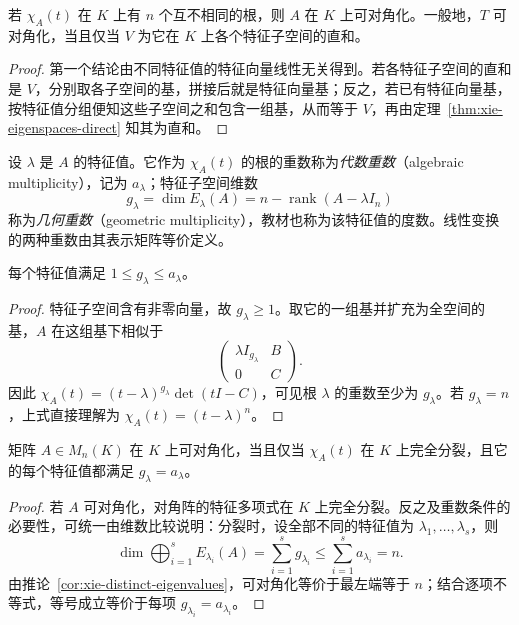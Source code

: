 \begin{corollary}
\label{cor:xie-distinct-eigenvalues}
若 $\chi_A(t)$ 在 $K$ 上有 $n$ 个互不相同的根，则 $A$ 在 $K$ 上可对角化。一般地，$T$ 可对角化，当且仅当 $V$ 为它在 $K$ 上各个特征子空间的直和。
\end{corollary}
\begin{proof}
第一个结论由不同特征值的特征向量线性无关得到。若各特征子空间的直和是 $V$，分别取各子空间的基，拼接后就是特征向量基；反之，若已有特征向量基，按特征值分组便知这些子空间之和包含一组基，从而等于 $V$，再由定理~\ref{thm:xie-eigenspaces-direct} 知其为直和。
\end{proof}

\begin{definition}
\label{def:xie-multiplicities}
设 $\lambda$ 是 $A$ 的特征值。它作为 $\chi_A(t)$ 的根的重数称为\emph{代数重数}（algebraic multiplicity），记为 $a_\lambda$；特征子空间维数
\[
 g_\lambda=\dim E_\lambda(A)=n-\operatorname{rank}(A-\lambda I_n)
\]
称为\emph{几何重数}（geometric multiplicity），教材也称为该特征值的度数。线性变换的两种重数由其表示矩阵等价定义。
\end{definition}

\begin{lemma}
\label{lem:xie-geometric-algebraic}
每个特征值满足 $1\leq g_\lambda\leq a_\lambda$。
\end{lemma}
\begin{proof}
特征子空间含有非零向量，故 $g_\lambda\geq1$。取它的一组基并扩充为全空间的基，$A$ 在这组基下相似于
\[
 \begin{pmatrix}\lambda I_{g_\lambda}&B\\0&C\end{pmatrix}.
\]
因此 $\chi_A(t)=(t-\lambda)^{g_\lambda}\det(tI-C)$，可见根 $\lambda$ 的重数至少为 $g_\lambda$。若 $g_\lambda=n$，上式直接理解为 $\chi_A(t)=(t-\lambda)^n$。
\end{proof}

\begin{theorem}[重数判据]
\label{thm:xie-multiplicity-criterion}
矩阵 $A\in M_n(K)$ 在 $K$ 上可对角化，当且仅当 $\chi_A(t)$ 在 $K$ 上完全分裂，且它的每个特征值都满足 $g_\lambda=a_\lambda$。
\end{theorem}
\begin{proof}
若 $A$ 可对角化，对角阵的特征多项式在 $K$ 上完全分裂。反之及重数条件的必要性，可统一由维数比较说明：分裂时，设全部不同的特征值为 $\lambda_1,\ldots,\lambda_s$，则
\[
 \dim\bigoplus_{i=1}^sE_{\lambda_i}(A)=\sum_{i=1}^s g_{\lambda_i}
 \leq\sum_{i=1}^s a_{\lambda_i}=n.
\]
由推论~\ref{cor:xie-distinct-eigenvalues}，可对角化等价于最左端等于 $n$；结合逐项不等式，等号成立等价于每项 $g_{\lambda_i}=a_{\lambda_i}$。
\end{proof}

